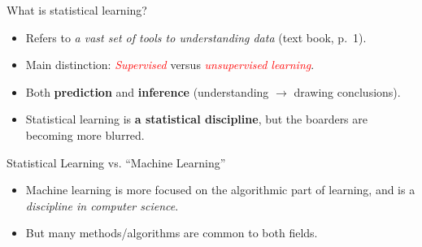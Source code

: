 \documentclass[10pt,ignorenonframetext,]{beamer}
\providecommand{\tightlist}{%
  \setlength{\itemsep}{0pt}\setlength{\parskip}{0pt}}
\begin{document}
\begin{frame}{What is statistical learning?}
\protect\hypertarget{what-is-statistical-learning}{}

\begin{itemize}
\tightlist
\item
  Refers to \emph{a vast set of tools to understanding data} (text book,
  p.~1).
\end{itemize}

\vspace{1mm}

\begin{itemize}
\tightlist
\item
  Main distinction: \emph{\textcolor{red}{Supervised}} versus
  \emph{\textcolor{red}{unsupervised learning}}.
\end{itemize}

\vspace{1mm}

\begin{itemize}
\tightlist
\item
  Both \textbf{prediction} and \textbf{inference} (understanding
  \(\rightarrow\) drawing conclusions).
\end{itemize}

\vspace{1mm}

\begin{itemize}
\tightlist
\item
  Statistical learning is \textbf{a statistical discipline}, but the
  boarders are becoming more blurred.
\end{itemize}

\end{frame}

\begin{frame}{Statistical Learning vs. ``Machine Learning''}
\protect\hypertarget{statistical-learning-vs.-machine-learning}{}

\vspace{2mm}

\begin{itemize}
\tightlist
\item
  Machine learning is more focused on the algorithmic part of learning,
  and is a \emph{discipline in computer science}.
\end{itemize}

\vspace{2mm}

\begin{itemize}
\tightlist
\item
  But many methods/algorithms are common to both fields.
\end{itemize}

\end{frame}
\end{document}
